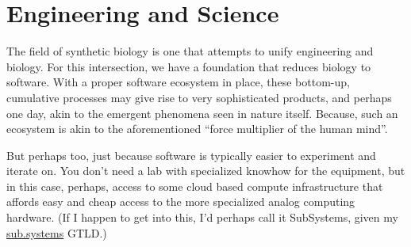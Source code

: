 \section*{Engineering and Science}

The field of synthetic biology is one that attempts to unify engineering and biology. For this intersection, we have a foundation that reduces biology to software. With a proper software ecosystem in place, these bottom-up, cumulative processes may give rise to very sophisticated products, and perhaps one day, akin to the emergent phenomena seen in nature itself. Because, such an ecosystem is akin to the aforementioned ``force multiplier of the human mind''.

But perhaps too, just because software is typically easier to experiment and iterate on. You don't need a lab with specialized knowhow for the equipment, but in this case, perhaps, access to some cloud based compute infrastructure that affords easy and cheap access to the more specialized analog computing hardware. (If I happen to get into this, I'd perhaps call it SubSystems, given my \url{sub.systems} GTLD.)
